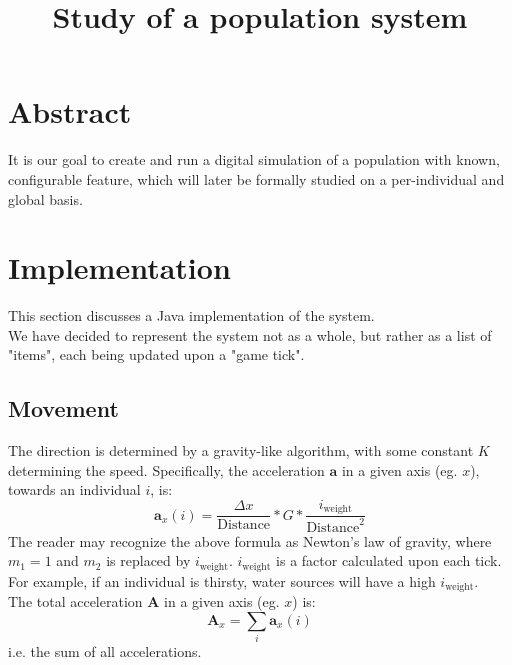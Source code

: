 \documentclass{article}
\title{Study of a population system}
\begin{document}
\maketitle

\section{Abstract}
It is our goal to create and run a digital simulation of a population with known, configurable feature, which will later be formally studied on a per-individual and global basis.

\section{Implementation}
This section discusses a Java implementation of the system.\\

We have decided to represent the system not as a whole, but rather as a list of "items", each being updated upon a "game tick".

\subsection{Movement}
The direction is determined by a gravity-like algorithm, with some constant $K$ determining the speed. Specifically, the acceleration $\mathbf a$ in a given axis (eg. $x$), towards an individual $i$, is:
\begin{equation}
\label{eqn:acc_singola}
\mathbf{a}_x(i) = \frac{\Delta x}{\text{Distance}}*G*\frac{i_\text{weight}}{\text{Distance}^2}
\end{equation}
The reader may recognize the above formula as Newton's law of gravity, where $m_1=1$ and $m_2$ is replaced by $i_\text{weight}$. $i_\text{weight}$ is a factor calculated upon each tick. For example, if an individual is thirsty, water sources will have a high $i_\text{weight}$.\\
The total acceleration $\mathbf A$ in a given axis (eg. $x$) is:
\begin{equation}
\label{eqn:acc_totale}
\mathbf{A}_x = \sum_i \mathbf{a}_x(i)
\end{equation}
i.e. the sum of all accelerations.
\end{document}
